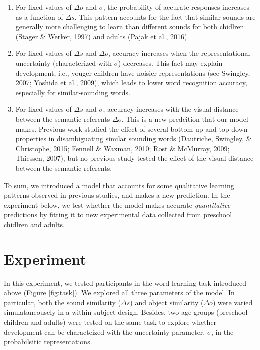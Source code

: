 \documentclass[10pt, letterpaper]{article}
\begin{document}
\begin{enumerate}
\def\labelenumi{\arabic{enumi})}
\item
  For fixed values of \(\Delta o\) and \(\sigma\), the probability of
  accurate responses increases as a function of \(\Delta s\). This
  pattern accounts for the fact that similar sounds are generally more
  challenging to learn than different sounds for both chidlren (Stager
  \& Werker, 1997) and adults (Pajak et al., 2016).
\item
  For fixed values of \(\Delta s\) and \(\Delta o\), accuracy increases
  when the representational uncertainty (characterized with \(\sigma\))
  decreases. This fact may explain development, i.e., youger children
  have noisier representations (see Swingley, 2007; Yoshida et al.,
  2009), which leads to lower word recognition accuracy, especially for
  similar-sounding words.
\item
  For fixed values of \(\Delta s\) and \(\sigma\), accuracy increases
  with the visual distance between the semantic referents \(\Delta o\).
  This is a new predcition that our model makes. Previous work studied
  the effect of several bottom-up and top-down properties in
  disambiguating similar sounding words (Dautriche, Swingley, \&
  Christophe, 2015; Fennell \& Waxman, 2010; Rost \& McMurray, 2009;
  Thiessen, 2007), but no previous study tested the effect of the visual
  distance between the semantic referents.
\end{enumerate}

To sum, we introduced a model that accounts for some qualitative
learning patterns observed in previous studies, and makes a new
prediction. In the experiment below, we test whether the model makes
accurate \emph{quantitative} predictions by fitting it to new
experimental data collected from preschool chidlren and adults.

\section{Experiment}\label{experiment}

In this experiment, we tested participants in the word learning task
introduced above (Figure \ref{fig:task}). We explored all three
parameters of the model. In particular, both the sound similarity
(\(\Delta s\)) and object similarity (\(\Delta o\)) were varied
simulataneousely in a within-subject design. Besides, two age groups
(preschool children and adults) were tested on the same task to explore
whether development can be characteized with the uncertainty parameter,
\(\sigma\), in the probabilsitic representations.
\end{document}
